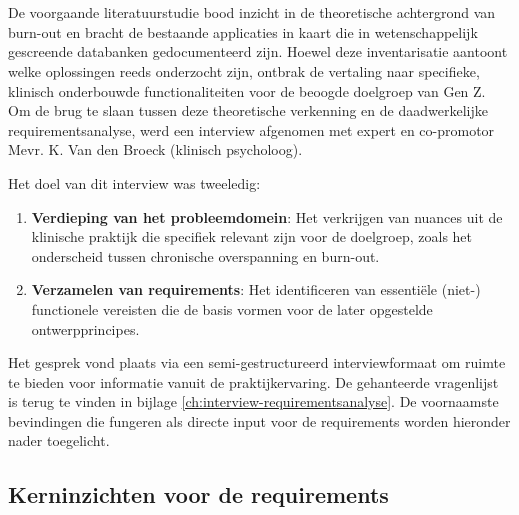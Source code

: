 
\chapter{}%
\label{ch:requirementsanalyse}

De voorgaande literatuurstudie bood inzicht in de theoretische achtergrond van burn-out en bracht de bestaande applicaties in kaart die in wetenschappelijk gescreende databanken gedocumenteerd zijn. Hoewel deze inventarisatie aantoont welke oplossingen reeds onderzocht zijn, ontbrak de vertaling naar specifieke, klinisch onderbouwde functionaliteiten voor de beoogde doelgroep van Gen Z. Om de brug te slaan tussen deze theoretische verkenning en de daadwerkelijke requirementsanalyse, werd een interview afgenomen met expert en co-promotor Mevr. K. Van den Broeck (klinisch psycholoog).

\vspace{1em}

Het doel van dit interview was tweeledig:

\begin{enumerate}
    \item \textbf{Verdieping van het probleemdomein}: Het verkrijgen van nuances uit de klinische praktijk die specifiek relevant zijn voor de doelgroep, zoals het onderscheid tussen chronische overspanning en burn-out.
    \item \textbf{Verzamelen van requirements}: Het identificeren van essentiële (niet-) \newline functionele vereisten die de basis vormen voor de later opgestelde \newline ontwerpprincipes.
\end{enumerate}

Het gesprek vond plaats via een semi-gestructureerd interviewformaat om ruimte te bieden voor informatie vanuit de praktijkervaring. De gehanteerde vragenlijst is terug te vinden in bijlage \ref{ch:interview-requirementsanalyse}. De voornaamste bevindingen die fungeren als directe input voor de requirements worden hieronder nader toegelicht.

\newpage

\section{Kerninzichten voor de requirements}
\label{sec:inzichten-voor-requirements}

